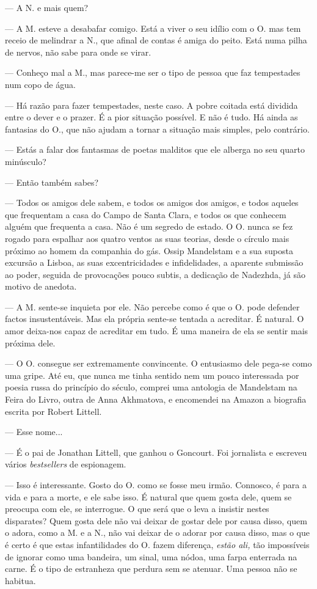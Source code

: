 --- A N. e mais quem?

--- A M. esteve a desabafar comigo. Está a viver o seu idílio com o O. mas
  tem receio de melindrar a N., que afinal de contas é amiga do peito.
  Está numa pilha de nervos, não sabe para onde se virar.

--- Conheço mal a M., mas parece-me ser o tipo de pessoa que faz
  tempestades num copo de água.

--- Há razão para fazer tempestades, neste caso. A pobre coitada está
  dividida entre o dever e o prazer. É a pior situação possível. E não é
  tudo. Há ainda as fantasias do O., que não ajudam a tornar a situação
  mais simples, pelo contrário.

--- Estás a falar dos fantasmas de poetas malditos que ele alberga no seu
  quarto minúsculo?

--- Então também sabes?

--- Todos os amigos dele sabem, e todos os amigos dos amigos, e todos
  aqueles que frequentam a casa do Campo de Santa Clara, e todos os que
  conhecem alguém que frequenta a casa. Não é um segredo de estado. O O.
  nunca se fez rogado para espalhar aos quatro ventos as suas teorias,
  desde o círculo mais próximo ao homem da companhia do gás. Ossip Mandelstam e a sua suposta excursão a Lisboa, as suas excentricidades e
  infidelidades, a aparente submissão ao poder, seguida de provocações
  pouco subtis, a dedicação de Nadezhda, já são motivo de anedota.

--- A M. sente-se inquieta por ele. Não percebe como é que o O. pode
  defender factos insustentáveis. Mas ela própria sente-se tentada a
  acreditar. É natural. O amor deixa-nos capaz de acreditar em tudo. É
  uma maneira de ela se sentir
mais próxima dele.

--- O O. consegue ser extremamente convincente. O entusiasmo dele
  pega-se como uma gripe. Até eu, que nunca me tinha sentido nem um
  pouco interessada por poesia russa do princípio do século, comprei uma
  antologia de Mandelstam na Feira do Livro, outra de Anna Akhmatova, e
  encomendei na Amazon a biografia escrita por Robert Littell.

--- Esse nome...

--- É o pai de Jonathan Littell, que ganhou o Goncourt.
Foi jornalista e escreveu vários \emph{bestsellers }de espionagem.

--- Isso é interessante. Gosto do O. como se fosse meu irmão. Connosco, é
  para a vida e para a morte, e ele sabe isso. É natural que quem gosta
  dele, quem se preocupa com ele, se interrogue. O que será que o leva a
  insistir nestes disparates? Quem gosta dele não vai deixar de gostar
  dele por causa disso, quem o adora, como a M. e a N., não vai deixar
  de o adorar por causa disso, mas o que é certo é que estas
  infantilidades do O. fazem diferença, \emph{estão ali, }tão impossíveis de ignorar como
uma bandeira, um sinal, uma nódoa, uma farpa enterrada na carne. É o
tipo de estranheza que perdura sem se atenuar. Uma pessoa não se
habitua.

